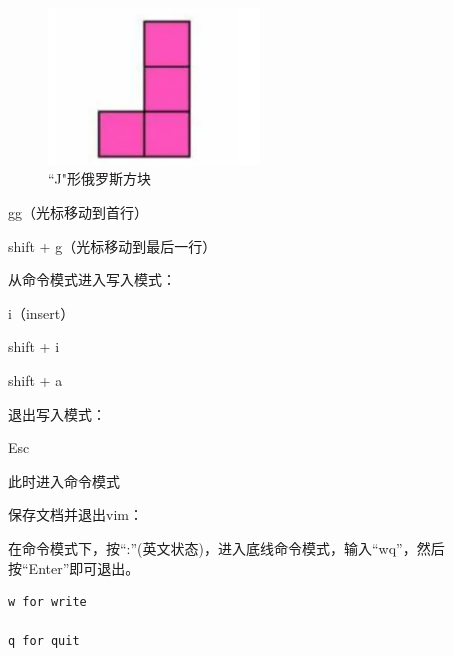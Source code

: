 \documentclass[12pt]{article}
\begin{document}
\begin{figure}[hbt!]
    \centering
    \includegraphics[width=0.5\textwidth]{img/j.png}
    \caption{``J"形俄罗斯方块}
\end{figure}

gg（光标移动到首行）

shift + g（光标移动到最后一行）

从命令模式进入写入模式：

i（insert）

shift + i

shift + a

退出写入模式：

Esc

此时进入命令模式

保存文档并退出vim：

在命令模式下，按“:”(英文状态)，进入底线命令模式，输入“wq”，然后按“Enter”即可退出。

\begin{verbatim}
w for write

q for quit
    
\end{verbatim}
\end{document}
